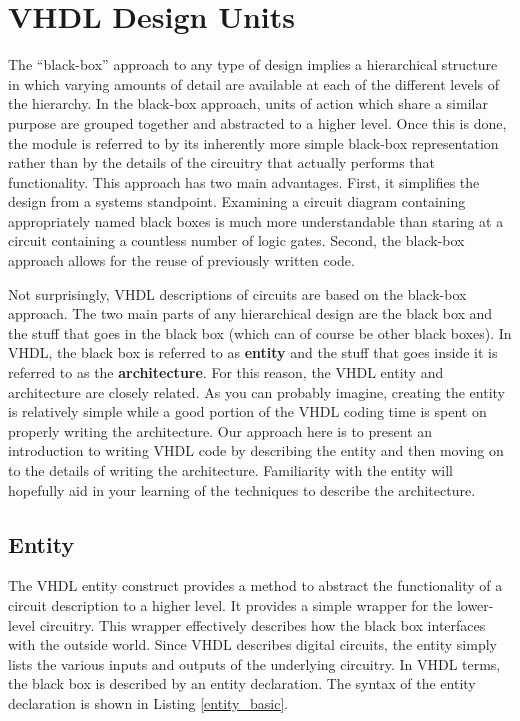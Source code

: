 %
%
\chapter{VHDL Design Units}
The ``black-box'' approach to any type of design implies a hierarchical structure in which varying amounts of detail are available at each of the different levels of the hierarchy. In the black-box approach, units of action which share a similar purpose are grouped together and abstracted to a higher level. Once this is done, the module is referred to by its inherently more simple black-box representation rather than by the details of the circuitry that actually performs that functionality. This approach has two main advantages. First, it simplifies the design from a systems standpoint. Examining a circuit diagram containing appropriately named black boxes is much more understandable than staring at a circuit containing a countless number of logic gates. Second, the black-box approach allows for the reuse of previously written code.

Not surprisingly, VHDL descriptions of circuits are based on the black-box approach. The two main parts of any hierarchical design are the black box and the stuff that goes in the black box (which can of course be other black boxes). In VHDL, the black box is referred to as \textbf{entity} and the stuff that goes inside it is referred to as the \textbf{architecture}. For this reason, the VHDL entity and architecture are closely related. As you can probably imagine, creating the entity is relatively simple while a good portion of the VHDL coding time is spent on properly writing the architecture. Our approach here is to present an introduction to writing VHDL code by describing the entity and then moving on to the details of writing the architecture. Familiarity with the entity will hopefully aid in your learning of the techniques to describe the architecture.

\section{Entity}
The VHDL entity construct provides a method to abstract the functionality of a circuit description to a higher level. It provides a simple wrapper for the lower-level circuitry. This wrapper effectively describes how the black box interfaces with the outside world. Since VHDL describes digital circuits, the entity simply lists the various inputs and outputs of the underlying circuitry. In VHDL terms, the black box is described by an entity declaration. The syntax of the entity declaration is shown in Listing \ref{entity_basic}.

